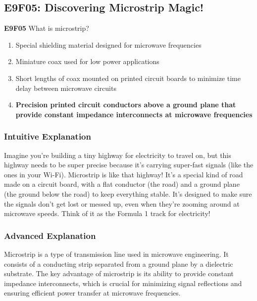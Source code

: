 \subsection{E9F05: Discovering Microstrip Magic!}

\begin{tcolorbox}[colback=gray!10!white,colframe=black!75!black]
    \textbf{E9F05} What is microstrip?  
    \begin{enumerate}[label=\Alph*),noitemsep]
        \item Special shielding material designed for microwave frequencies
        \item Miniature coax used for low power applications
        \item Short lengths of coax mounted on printed circuit boards to minimize time delay between microwave circuits
        \item \textbf{Precision printed circuit conductors above a ground plane that provide constant impedance interconnects at microwave frequencies}
    \end{enumerate}
\end{tcolorbox}

\subsubsection{Intuitive Explanation}
Imagine you’re building a tiny highway for electricity to travel on, but this highway needs to be super precise because it’s carrying super-fast signals (like the ones in your Wi-Fi). Microstrip is like that highway! It’s a special kind of road made on a circuit board, with a flat conductor (the road) and a ground plane (the ground below the road) to keep everything stable. It’s designed to make sure the signals don’t get lost or messed up, even when they’re zooming around at microwave speeds. Think of it as the Formula 1 track for electricity!

\subsubsection{Advanced Explanation}
Microstrip is a type of transmission line used in microwave engineering. It consists of a conducting strip separated from a ground plane by a dielectric substrate. The key advantage of microstrip is its ability to provide constant impedance interconnects, which is crucial for minimizing signal reflections and ensuring efficient power transfer at microwave frequencies.


